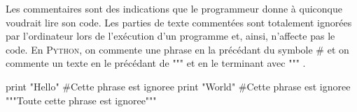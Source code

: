 Les commentaires sont des indications que le programmeur donne à quiconque voudrait lire son code. Les parties de texte commentées sont totalement ignorées par l'ordinateur lors de l'exécution d'un programme et, ainsi, n'affecte pas le code. En \textsc{Python}, on commente une phrase en la précédant du symbole \# et on commente un texte en le précédant de """ et en le terminant avec """ .
\begin{python}
print "Hello"
#Cette phrase est ignoree
print "World" #Cette phrase est ignoree
"""Toute
cette
phrase
est
ignoree"""
\end{python}
